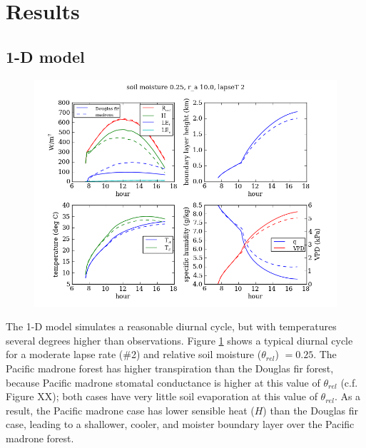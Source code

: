 \section{Results}

\subsection{1-D model}

\begin{figure}[here]
\includegraphics[width=1\textwidth]{ch2-BL/figures/testall_Aug15_soilm0pt25_ra10_lapseT2.png}
\caption{}
\label{fig:BL_1Ddiurnal}
\end{figure}

The 1-D model simulates a reasonable diurnal cycle, but with temperatures several degrees higher than observations.  Figure \ref{fig:BL_1Ddiurnal} shows a typical diurnal cycle for a moderate lapse rate (\#2) and relative soil moisture ($\theta_{rel}$) $= 0.25$.  The Pacific madrone forest has higher transpiration than the Douglas fir forest, because Pacific madrone stomatal conductance is higher at this value of $\theta_{rel}$ (c.f. Figure XX); both cases have very little soil evaporation at this value of $\theta_{rel}$.  As a result, the Pacific madrone case has lower sensible heat ($H$) than the Douglas fir case, leading to a shallower, cooler, and moister boundary layer over the Pacific madrone forest.

